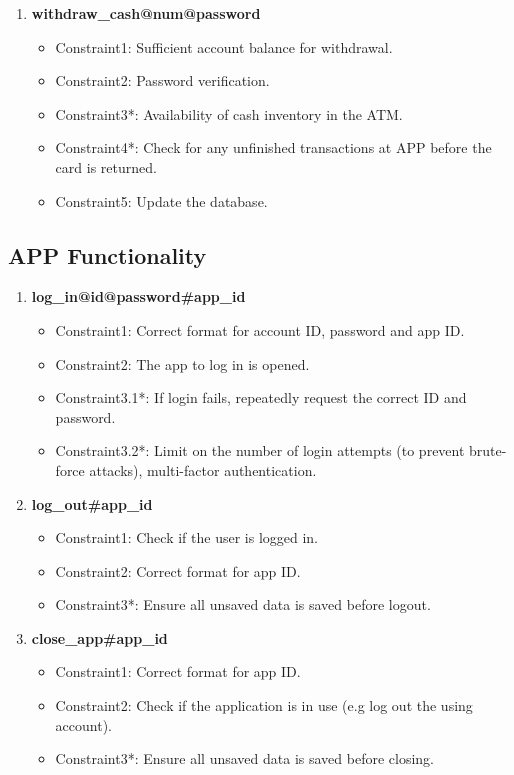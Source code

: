 \documentclass[12pt]{article}
\begin{document}
\begin{enumerate}
    \item \textbf{withdraw\_cash@num@password}
        \begin{itemize}
            \item Constraint1: Sufficient account balance for withdrawal.
            \item Constraint2: Password verification.
            \item Constraint3*: Availability of cash inventory in the ATM.
            \item Constraint4*: Check for any unfinished transactions at APP before the card is returned.
            \item Constraint5: Update the database.
        \end{itemize}
\end{enumerate}

\subsection{APP Functionality}

\begin{enumerate}
    \item \textbf{log\_in@id@password\#app\_id}
        \begin{itemize}
            \item Constraint1: Correct format for account ID, password and app ID.
            \item Constraint2: The app to log in is opened.
            \item Constraint3.1*: If login fails, repeatedly request the correct ID and password.
            \item Constraint3.2*: Limit on the number of login attempts (to prevent brute-force attacks), multi-factor authentication.
        \end{itemize}
        
    \item \textbf{log\_out\#app\_id}
        \begin{itemize}
            \item Constraint1: Check if the user is logged in.
            \item Constraint2: Correct format for app ID.
            \item Constraint3*: Ensure all unsaved data is saved before logout.
        \end{itemize}
        
    \item \textbf{close\_app\#app\_id}
        \begin{itemize}
            \item Constraint1: Correct format for app ID.
            \item Constraint2: Check if the application is in use (e.g log out the using account).
            \item Constraint3*: Ensure all unsaved data is saved before closing.
        \end{itemize}
\end{enumerate}
\end{document}

